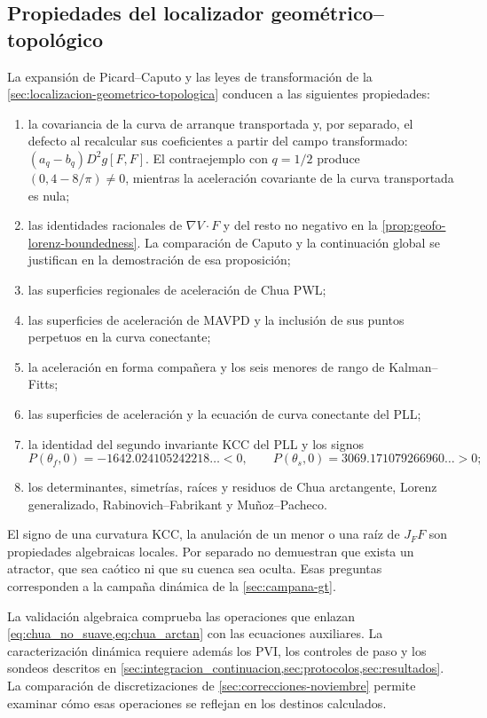 \subsection{Propiedades del localizador geométrico--topológico}

La expansión de Picard--Caputo y las leyes de transformación de la
\cref{sec:localizacion-geometrico-topologica} conducen a las siguientes
propiedades:
\begin{enumerate}
 \item la covariancia de la curva de arranque transportada y, por separado,
 el defecto al recalcular sus coeficientes a partir del campo transformado:
 $(a_q-b_q)D^2g[F,F]$. El contraejemplo con $q=1/2$ produce
 $(0,4-8/\pi)\ne0$, mientras la aceleración covariante de la curva transportada
 es nula;
 \item las identidades racionales de $\nabla V\cdot F$ y del resto no negativo
 en la \cref{prop:geofo-lorenz-boundedness}. La comparación de Caputo y la
 continuación global se justifican en la demostración de esa proposición;
 \item las superficies regionales de aceleración de Chua PWL;
 \item las superficies de aceleración de MAVPD y la inclusión de sus puntos
 perpetuos en la curva conectante;
 \item la aceleración en forma compañera y los seis menores de rango de
 Kalman--Fitts;
 \item las superficies de aceleración y la ecuación de curva conectante del
 PLL;
 \item la identidad del segundo invariante KCC del PLL y los signos
 \[
 P(\theta_f,0)=-1642.024105242218\ldots<0,
 \qquad
 P(\theta_s,0)=3069.171079266960\ldots>0;
 \]
 \item los determinantes, simetrías, raíces y residuos de Chua arctangente,
 Lorenz generalizado, Rabinovich--Fabrikant y Muñoz--Pacheco.
\end{enumerate}
El signo de una curvatura KCC, la anulación de un menor o una raíz de
\(J_FF\) son propiedades algebraicas locales. Por separado no demuestran que
exista un atractor, que sea caótico ni que su cuenca sea oculta. Esas preguntas
corresponden a la campaña dinámica de la \cref{sec:campana-gt}.

La validación algebraica comprueba las operaciones que enlazan
\cref{eq:chua_no_suave,eq:chua_arctan} con las ecuaciones auxiliares. La
caracterización dinámica requiere además los PVI, los controles de paso y los
sondeos descritos en \cref{sec:integracion_continuacion,sec:protocolos,sec:resultados}.
La comparación de discretizaciones de \cref{sec:correcciones-noviembre}
permite examinar cómo esas operaciones se reflejan en los destinos calculados.
